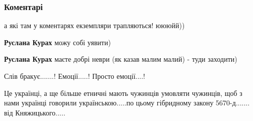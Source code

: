  
 
 
 
 
\subsubsection{Коментарі}
\label{sec:25_07_2021.fb.bordovskaja_anna.1.smolij_porohobot.cmt}

\begin{itemize}
 
а які там у коментарях екземпляри трапляються! юююйй))

\begin{itemize}
 
\textbf{Руслана Курах} можу собі уявити)

 
\textbf{Руслана Курах} маєте добрі неври (як казав малим малий) - туди заходити)

 

\obeycr
Слів бракує.......!
Емоції.....!
Просто емоції....!
\restorecr

Це українці, а ще більше етничні мають чужинців умовляти чужинців, щоб з нами
українці говорили українською.....по цьому гібридному закону 5670-д.......  від
Княжицького.....


\end{itemize}
\end{itemize}
